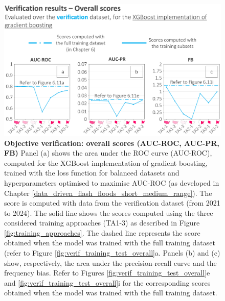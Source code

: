 \begin{figure}[htbp]
\centering
\includegraphics[width=\textwidth]{verif_overall_scores.png}
\caption{\textbf{Objective verification: overall scores (AUC-ROC, AUC-PR, FB)} Panel (a) shows the area under the ROC curve (AUC-ROC), computed for the XGBoost implementation of gradient boosting, trained with the loss function for balanced datasets and hyperparameters optimised to maximise AUC-ROC (as developed in Chapter \ref{data_driven_flash_floods_short_medium_range}). The score is computed with data from the \textcolor{colourTest}{verification} dataset (from 2021 to 2024). The solid line shows the scores computed using the three considered training approaches (TA1-3) as described in Figure \ref{fig:training_approaches}. The dashed line represents the score obtained when the model was trained with the full training dataset (refer to Figure \ref{fig:verif_training_test_overall}a. Panels (b) and (c) show, respectively, the area under the precision-recall curve and the frequency bias. Refer to Figures \ref{fig:verif_training_test_overall}e and \ref{fig:verif_training_test_overall}i for the corresponding scores obtained when the model was trained with the full training dataset.}
\label{fig:verif_overall_scores}
\end{figure}

